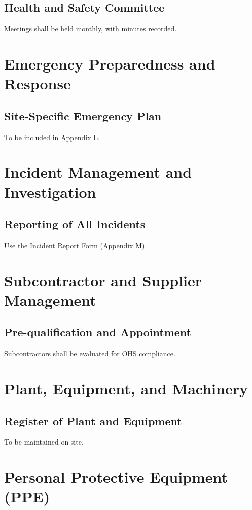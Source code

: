 \documentclass[12pt]{article}
\begin{document}
\subsection{Health and Safety Committee}
Meetings shall be held monthly, with minutes recorded.

\section{Emergency Preparedness and Response}

\subsection{Site-Specific Emergency Plan}
To be included in Appendix L.

\section{Incident Management and Investigation}

\subsection{Reporting of All Incidents}
Use the Incident Report Form (Appendix M).

\section{Subcontractor and Supplier Management}

\subsection{Pre-qualification and Appointment}
Subcontractors shall be evaluated for OHS compliance.

\section{Plant, Equipment, and Machinery}

\subsection{Register of Plant and Equipment}
To be maintained on site.

\section{Personal Protective Equipment (PPE)}
\end{document}
